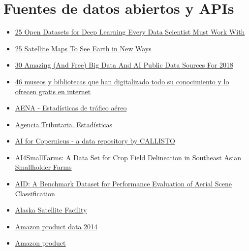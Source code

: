 \documentclass[
  letterpaper,
  DIV=11,
  numbers=noendperiod]{scrartcl}
\providecommand{\tightlist}{%
  \setlength{\itemsep}{0pt}\setlength{\parskip}{0pt}}
\begin{document}
\section{Fuentes de datos abiertos y
APIs}\label{fuentes-de-datos-abiertos-y-apis}

\begin{itemize}
\tightlist
\item
  \href{https://www.analyticsvidhya.com/blog/2018/03/comprehensive-collection-deep-learning-datasets/}{25
  Open Datasets for Deep Learning Every Data Scientist Must Work With}
\item
  \href{https://gisgeography.com/satellite-maps/}{25 Satellite Maps To
  See Earth in New Ways}
\item
  \href{https://www.linkedin.com/pulse/30-amazing-free-big-data-ai-public-sources-2018-bernard-marr/?trackingId=nkTXcNLieYPDBqZuB3KIsw\%3D\%3D&lipi=urn\%3Ali\%3Apage\%3Ad_flagship3_feed\%3B9KuSD9KfQ6ie\%2BALso3gwvw\%3D\%3D&licu=urn\%3Ali\%3Acontrol\%3Ad_flagship3_feed-object}{30
  Amazing (And Free) Big Data And AI Public Data Sources For 2018}
\item
  \href{http://www.xataka.com/otros/46-museos-y-bibliotecas-que-han-digitalizado-todo-su-conocimiento-humano}{46
  museos y bibliotecas que han digitalizado todo su conocimiento y lo
  ofrecen gratis en internet}
\item
  \href{https://www.aena.es/es/estadisticas/inicio.html}{AENA -
  Estadísticas de tráfico aéreo}
\item
  \href{https://sede.agenciatributaria.gob.es/Sede/estadisticas.html}{Agencia
  Tributaria. Estadísticas}
\item
  \href{https://github.com/Agri-Hub/Callisto-Dataset-Collection}{AI for
  Copernicus - a data repository by CALLISTO}
\item
  \href{https://phys-techsciences.datastations.nl/dataset.xhtml?persistentId=doi:10.17026/dans-xy6-ngg6}{AI4SmallFarms:
  A Data Set for Crop Field Delineation in Southeast Asian Smallholder
  Farms}
\item
  \href{https://captain-whu.github.io/AID/}{AID: A Benchmark Dataset for
  Performance Evaluation of Aerial Scene Classification}
\item
  \href{https://asf.alaska.edu/getstarted/}{Alaska Satellite Facility}
\item
  \href{http://jmcauley.ucsd.edu/data/amazon/}{Amazon product data 2014}
\item
  \href{https://nijianmo.github.io/amazon/index.html}{Amazon product
}
\end{itemize}
\end{document}
